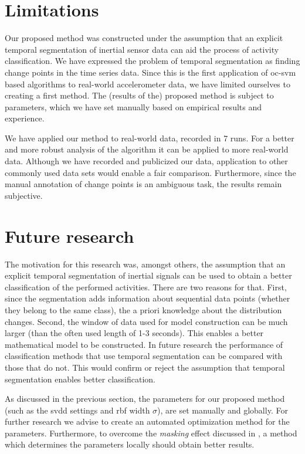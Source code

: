 
\section{Limitations}\label{sec:limitations}
Our proposed method was constructed under the assumption that an explicit temporal segmentation of inertial sensor data can aid the process of activity classification.
We have expressed the problem of temporal segmentation as finding change points in the time series data.
Since this is the first application of \gls{oc-svm} based algorithms to real-world accelerometer data, we have limited ourselves to creating a first method.
The (results of the) proposed method is subject to parameters, which we have set manually based on empirical results and experience.

We have applied our method to real-world data, recorded in 7 runs.
For a better and more robust analysis of the algorithm it can be applied to more real-world data.
Although we have recorded and publicized our data, application to other commonly used data sets would enable a fair comparison.
Furthermore, since the manual annotation of change points is an ambiguous task, the results remain subjective.

\section{Future research}\label{sec:further_research}
The motivation for this research was, amongst others, the assumption that an explicit temporal segmentation of inertial signals can be used to obtain a better classification of the performed activities.
There are two reasons for that.
First, since the segmentation adds information about sequential data points (whether they belong to the same class), the a priori knowledge about the distribution changes.
Second, the window of data used for model construction can be much larger (than the often used length of 1-3 seconds).
This enables a better mathematical model to be constructed.
In future research the performance of classification methods that use temporal segmentation can be compared with those that do not.
This would confirm or reject the assumption that temporal segmentation enables better classification.

As discussed in the previous section, the parameters for our proposed method (such as the \gls{svdd} settings and \gls{rbf} width $\sigma$), are set manually and globally.
For further research we advise to create an automated optimization method for the parameters.
Furthermore, to overcome the \emph{masking} effect discussed in , a method which determines the parameters locally should obtain better results.

